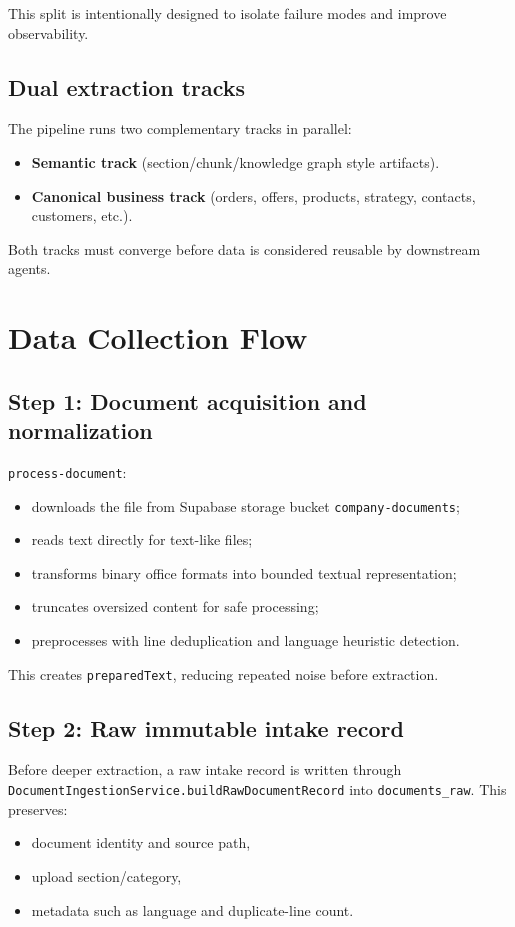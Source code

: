 \documentclass[11pt,a4paper]{article}
\begin{document}
This split is intentionally designed to isolate failure modes and improve observability.

\subsection{Dual extraction tracks}
The pipeline runs two complementary tracks in parallel:
\begin{itemize}[leftmargin=*]
  \item \textbf{Semantic track} (section/chunk/knowledge graph style artifacts).
  \item \textbf{Canonical business track} (orders, offers, products, strategy, contacts, customers, etc.).
\end{itemize}

Both tracks must converge before data is considered reusable by downstream agents.

\section{Data Collection Flow}
\subsection{Step 1: Document acquisition and normalization}
\texttt{process-document}:
\begin{itemize}[leftmargin=*]
  \item downloads the file from Supabase storage bucket \texttt{company-documents};
  \item reads text directly for text-like files;
  \item transforms binary office formats into bounded textual representation;
  \item truncates oversized content for safe processing;
  \item preprocesses with line deduplication and language heuristic detection.
\end{itemize}

This creates \texttt{preparedText}, reducing repeated noise before extraction.

\subsection{Step 2: Raw immutable intake record}
Before deeper extraction, a raw intake record is written through \texttt{DocumentIngestionService.buildRawDocumentRecord} into \texttt{documents\_raw}. This preserves:
\begin{itemize}[leftmargin=*]
  \item document identity and source path,
  \item upload section/category,
  \item metadata such as language and duplicate-line count.
\end{itemize}
\end{document}
